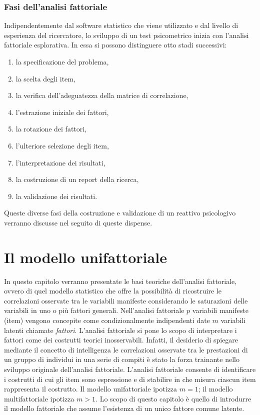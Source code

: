 \documentclass[
  11pt,
]{krantz}
\providecommand{\tightlist}{%
  \setlength{\itemsep}{0pt}\setlength{\parskip}{0pt}}
\theoremstyle{definition}
\theoremstyle{definition}
\theoremstyle{definition}
\theoremstyle{definition}
\theoremstyle{remark}
\begin{document}
\hypertarget{fasi-dellanalisi-fattoriale}{%
\subsection{Fasi dell'analisi fattoriale}\label{fasi-dellanalisi-fattoriale}}

Indipendentemente dal software statistico che viene utilizzato e dal livello di esperienza del ricercatore, lo sviluppo di un test psicometrico inizia con l'analisi fattoriale esplorativa. In essa si possono distinguere otto stadi successivi:

\begin{enumerate}
\def\labelenumi{\arabic{enumi}.}
\tightlist
\item
  la specificazione del problema,
\item
  la scelta degli item,
\item
  la verifica dell'adeguatezza della matrice di correlazione,
\item
  l'estrazione iniziale dei fattori,
\item
  la rotazione dei fattori,
\item
  l'ulteriore selezione degli item,
\item
  l'interpretazione dei risultati,
\item
  la costruzione di un report della ricerca,
\item
  la validazione dei risultati.
\end{enumerate}

Queste diverse fasi della costruzione e validazione di un reattivo psicologivo verranno discusse nel seguito di queste dispense.

\hypertarget{ch:spearman}{%
\chapter{Il modello unifattoriale}\label{ch:spearman}}

In questo capitolo verranno presentate le basi teoriche dell'analisi fattoriale, ovvero di quel modello statistico che offre la possibilità di ricostruire le correlazioni osservate tra le variabili manifeste considerando le saturazioni delle variabili in uno o più fattori generali. Nell'analisi fattoriale \(p\) variabili manifeste (item) vengono concepite come condizionalmente indipendenti date \(m\) variabili latenti chiamate \emph{fattori}. L'analisi fattoriale si pone lo scopo di interpretare i fattori come dei costrutti teorici inosservabili. Infatti, il desiderio di spiegare mediante il concetto di intelligenza le correlazioni osservate tra le prestazioni di un gruppo di individui in una serie di compiti è stato la forza trainante nello sviluppo originale dell'analisi fattoriale. L'analisi fattoriale consente di identificare i costrutti di cui gli item sono espressione e di stabilire in che misura ciascun item rappresenta il costrutto. Il modello unifattoriale ipotizza \(m = 1\); il modello multifattoriale ipotizza \(m > 1\). Lo scopo di questo capitolo è quello di introdurre il modello fattoriale che assume l'esistenza di un unico fattore comune latente.
\end{document}
